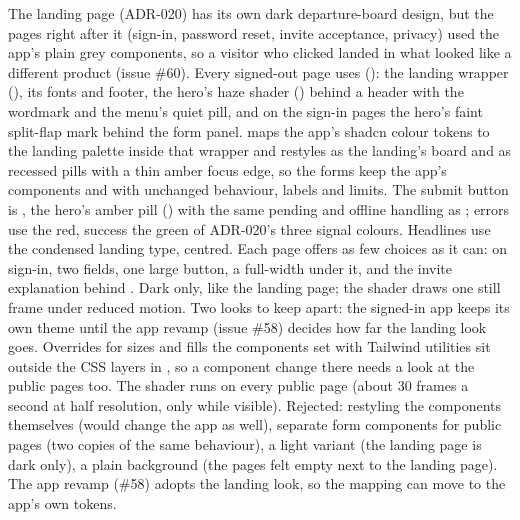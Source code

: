   {The landing page (ADR-020) has its own dark departure-board design, but the pages right after
   it (sign-in, password reset, invite acceptance, privacy) used the app's plain grey components,
   so a visitor who clicked  landed in what looked like a different product (issue
   \#60).}
  {Every signed-out page uses  (): the landing
   wrapper (), its fonts and footer, the hero's haze shader
   () behind a header with the wordmark and the menu's quiet 
   pill, and on the sign-in pages the hero's faint split-flap mark behind the form panel.
    maps the app's shadcn colour tokens to the landing palette inside that
   wrapper and restyles  as the landing's board and  as recessed pills
   with a thin amber focus edge, so the forms keep the app's components and 
   with unchanged behaviour, labels and limits. The submit button is , the
   hero's amber pill () with the same pending and offline handling as
   ; errors use the red, success the green of ADR-020's three signal colours.
   Headlines use the condensed landing type, centred. Each page offers as few choices as it can:
   on sign-in, two fields, one large button, a full-width  under it, and the
   invite explanation behind . Dark only, like the landing page; the shader
   draws one still frame under reduced motion.}
  {Two looks to keep apart: the signed-in app keeps its own theme until the app revamp (issue
   \#58) decides how far the landing look goes. Overrides for sizes and fills the components set
   with Tailwind utilities sit outside the CSS layers in , so a component change
   there needs a look at the public pages too. The shader runs on every public page (about 30
   frames a second at half resolution, only while visible). Rejected: restyling the components
   themselves (would change the app as well), separate form components for public pages (two
   copies of the same behaviour), a light variant (the landing page is dark only), a plain
   background (the pages felt empty next to the landing page).}
  {The app revamp (\#58) adopts the landing look, so the mapping can move to the app's own tokens.}

